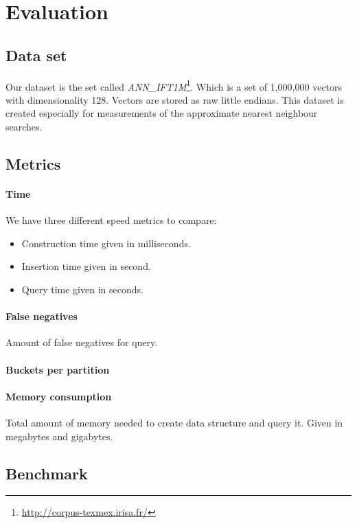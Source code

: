 \section{Evaluation}
\label{evaluation}

\subsection{Data set}

Our dataset is the set called \textit{ANN\_IFT1M}\footnote{\url{http://corpus-texmex.irisa.fr/}}. Which is a set of 1,000,000 vectors with dimensionality 128. Vectors are stored as raw little endians. This dataset is created especially for measurements of the approximate nearest neighbour searches.

\subsection{Metrics}

\paragraph{Time} We have three different speed metrics to compare:

\begin{itemize}
  \item Construction time given in milliseconds.
  \item Insertion time given in second.
  \item Query time given in seconds.
\end{itemize}

\paragraph{False negatives} Amount of false negatives for query.
\paragraph{Buckets per partition}

\paragraph{Memory consumption} Total amount of memory needed to create data structure and query it. Given in megabytes and gigabytes.

\subsection{Benchmark}

